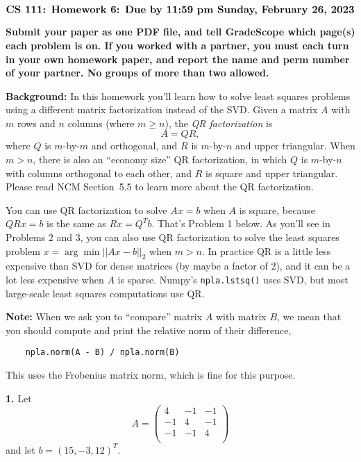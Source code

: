 \documentclass[11pt]{article}
\begin{document}
$$\mbox{\Large \bf CS 111: Homework 6: Due by 11:59 pm Sunday, February 26, 2023}$$
\par\smallskip\noindent
{\bf Submit your paper as one PDF file,
and tell GradeScope which page(s) each problem is on.
If you worked with a partner, you must each turn in your own 
homework paper, and report the name and perm number of your partner.
No groups of more than two allowed.
}

\par\bigskip
{\bf Background:}
In this homework you'll learn how to solve least squares problems using 
a different matrix factorization instead of the SVD.
Given a matrix $A$ with $m$ rows and $n$ columns (where $m \ge n$),
the {\em QR factorization} is
$$A = QR,$$
where $Q$ is $m$-by-$m$ and orthogonal, and $R$ is $m$-by-$n$ and upper triangular.
When $m>n$, there is also an ``economy size'' QR factorization,
in which $Q$ is $m$-by-$n$ with columns orthogonal to each other, 
and $R$ is square and upper triangular.
Please read NCM Section~5.5 to learn more about the QR factorization.

You can use QR factorization to solve $Ax=b$ when $A$ is square,
because $QRx=b$ is the same as $Rx=Q^Tb$. That's Problem 1 below.
As you'll see in Problems 2 and 3, you can also use QR factorization
to solve the least squares problem $x = \arg\min||Ax-b||_2$ when $m>n$.
In practice QR is a little less expensive than SVD for dense matrices
(by maybe a factor of 2), and it can be a lot less expensive when $A$ is sparse.
Numpy's {\tt npla.lstsq()} uses SVD, 
but most large-scale least squares computations use QR.

\par\medskip
{\bf Note:}
When we ask you to ``compare'' matrix $A$ with matrix $B$, 
we mean that you should compute and print the relative norm of their difference,
\begin{verbatim}
    npla.norm(A - B) / npla.norm(B)
\end{verbatim}
This uses the Frobenius matrix norm, which is fine for this purpose.

\par\bigskip
{\bf 1.}
Let
$$A =
   \left(
   \begin{array}{ccc}
    4 & -1 & -1 \\ 	
   -1 &  4 & -1 \\ 
   -1 & -1 &  4 \\
   \end{array} \right)
$$
and let $b = (15, -3, 12)^T$.
\end{document}
